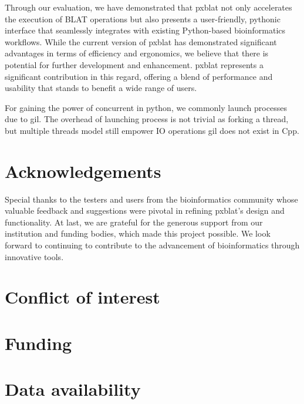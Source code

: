 Through our evaluation, we have demonstrated that \gls{pxblat} not only accelerates the execution of BLAT operations but also presents a user-friendly,
pythonic interface that seamlessly integrates with existing Python-based bioinformatics workflows.
While the current version of \gls{pxblat}  has demonstrated significant advantages in terms of efficiency and ergonomics, we believe that there is potential for further development and enhancement.
\gls{pxblat} represents a significant contribution in this regard, offering a blend of performance and usability that stands to benefit a wide range of users.

For gaining the power of concurrent in python, we commonly launch processes due to \gls{gil}.
The overhead of launching process is not trivial as forking a thread, but multiple threads model still empower IO operations
\gls{gil} does not exist in Cpp.


\section*{Acknowledgements}\label{sec:acknowledgements}

Special thanks to the testers and users from the bioinformatics community whose valuable feedback and suggestions were pivotal in refining \gls{pxblat}'s design and functionality.
At last, we are grateful for the generous support from our institution and funding bodies, which made this project possible.
We look forward to continuing to contribute to the advancement of bioinformatics through innovative tools.

\section*{Conflict of interest}\label{sec:conflict-of-interest}


\section*{Funding}\label{sec:funding}


\section*{Data availability}\label{sec:data-availability}


